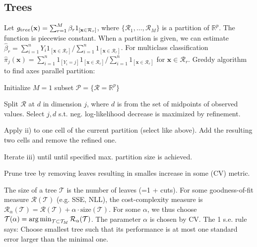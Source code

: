 \subsection{Trees}%
\label{sub:trees}
\begin{sectionbox}\nospacing{}
  Let $g_{\textrm tree}(\mathbf{x}) = \sum_{r=1}^{M}\beta_r 1_{[\mathbf{x}\in \mathcal{R}_r]}$, where $\{\mathcal{R}_1,\dots, \mathcal{R}_M\}$ is a partition of $\mathbb{R}^p$.
  The function is piecewise constant.
  When a partition is given,  we can estimate $\hat{\beta}_r = \sum_{i=1}^{n}Y_i 1_{[\mathbf{x}\in \mathcal{R}_r]}/\sum_{i=1}^{n}1_{[\mathbf{x}\in \mathcal{R}_r]}$.
  For multiclass classification $\hat{\pi}_j(\mathbf{x}) = \sum_{i=1}^{n}1_{[Y_i =j]} 1_{[\mathbf{x}\in \mathcal{R}_r]}/\sum_{i=1}^{n}1_{[\mathbf{x}\in \mathcal{R}_r]}$ for $\mathbf{x} \in \mathcal{R}_r$.
  Greddy algorithm to find axes parallel partition:
  \begin{enumeratenosep}[label=\roman*]
    \item Initialize $M=1$ subset $\mathcal{P} = \{\mathcal{R} = \mathbb{R}^p\}$
    \item Split $\mathcal{R}$ at $d$ in dimension $j$, where $d$ is from the set of midpoints of observed values.
      Select $j,d$ s.t. neg. log-likelihood decrease is maximized by refinement.
    \item Apply ii) to one cell of the current partition (select like above).
      Add the resulting two cells and remove the refined one. 
    \item Iterate iii) until until specified max. partition size is achieved.
    \item Prune tree by removing leaves resulting in smalles increase in some (CV) metric.
  \end{enumeratenosep}
  The size of a tree $\mathcal{T}$ is the number of leaves (=1 + cuts).
  For some goodness-of-fit measure $\mathcal{R}(\mathcal{T})$ (e.g. SSE, NLL), the cost-complexity measure is $\mathcal{R}_{\alpha}(\mathcal{T})=\mathcal{R}(\mathcal{T}) + \alpha \cdot\text{size}(\mathcal{T}) $.
  For some $\alpha$, we thus choose $\mathcal{T}(\alpha) = \operatorname*{arg\,min}_{\mathcal{T}\subset\mathcal{T}_M}\mathcal{R}_{\alpha}(\mathcal{T})$.
  The parameter $\alpha$ is chosen by CV. The 1 s.e. rule says: Choose smallest tree such that its performance is at most one standard error larger than the minimal one. 
\end{sectionbox}


